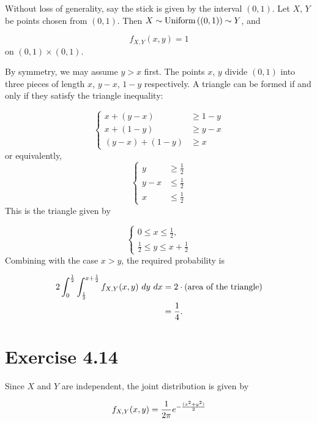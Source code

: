 \documentclass[12pt,letterpaper,reqno]{amsart}
\numberwithin{equation}{subsection}
\begin{document}
Without loss of generality, say the stick is given by the interval $(0,1)$. Let $X$, $Y$ be points chosen from $(0,1)$. Then $X \sim \uniformdist{(0,1)} \sim Y$, and

\[ f_{X,Y}(x,y) = 1 \]
on $(0,1) \times (0,1)$.

By symmetry, we may assume $y > x$ first. The points $x$, $y$ divide $(0,1)$ into three pieces of length $x$, $y-x$, $1-y$ respectively. A triangle can be formed if and only if they satisfy the triangle inequality:

\[ \left\{ \begin{array}{cl}
     x+(y-x) &\geq 1-y \\
     x+(1-y) &\geq y-x \\
     (y-x)+(1-y) &\geq x
\end{array} \right. \]
or equivalently,
\[ \left\{ \begin{array}{cl}
     y &\geq \frac{1}{2} \\
     y-x &\leq \frac{1}{2} \\
     x &\leq \frac{1}{2}
\end{array} \right. \]
This is the triangle given by

\[ \left\{ \begin{array}{l}
     0 \leq x \leq \frac{1}{2}, \\
     \frac{1}{2} \leq y \leq x + \frac{1}{2}
\end{array} \right. \]
Combining with the case $x>y$, the required probability is

\begin{align*}
    2 \myint{\myint{f_{X,Y}(x,y)}{y}{\frac{1}{2}}{x + \frac{1}{2}}}{x}{0}{\frac{1}{2}}
    &= 2 \cdot \left(\mbox{area of the triangle} \right) \\
    &= \frac{1}{4}.
\end{align*}

\newpage
\section{Exercise 4.14}
\label{Exercise 4.14}

Since $X$ and $Y$ are independent, the joint distribution is given by

\[ \fun{f_{X,Y}}{x,y} = \frac{1}{2\pi} e^{-\frac{(x^2+y^2)}{2}} \]
\end{document}
